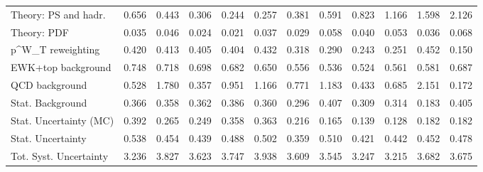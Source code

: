 \begin{tabular}{l|p{0.6cm}p{0.6cm}p{0.6cm}p{0.6cm}p{0.6cm}p{0.6cm}p{0.6cm}p{0.6cm}p{0.6cm}p{0.6cm}p{0.6cm}}
Theory: PS and hadr.                     & 0.656 & 0.443 & 0.306 & 0.244 & 0.257 & 0.381 & 0.591 & 0.823 & 1.166 & 1.598 & 2.126 \\
Theory: PDF                              & 0.035 & 0.046 & 0.024 & 0.021 & 0.037 & 0.029 & 0.058 & 0.040 & 0.053 & 0.036 & 0.068 \\
p^{W}_{T} reweighting                    & 0.420 & 0.413 & 0.405 & 0.404 & 0.432 & 0.318 & 0.290 & 0.243 & 0.251 & 0.452 & 0.150 \\
EWK+top background                       & 0.748 & 0.718 & 0.698 & 0.682 & 0.650 & 0.556 & 0.536 & 0.524 & 0.561 & 0.581 & 0.687 \\
QCD background                           & 0.528 & 1.780 & 0.357 & 0.951 & 1.166 & 0.771 & 1.183 & 0.433 & 0.685 & 2.151 & 0.172 \\
Stat. Background                         & 0.366 & 0.358 & 0.362 & 0.386 & 0.360 & 0.296 & 0.407 & 0.309 & 0.314 & 0.183 & 0.405 \\
Stat. Uncertainty (MC)                   & 0.392 & 0.265 & 0.249 & 0.358 & 0.363 & 0.216 & 0.165 & 0.139 & 0.128 & 0.182 & 0.182 \\
\hline
Stat. Uncertainty                        & 0.538 & 0.454 & 0.439 & 0.488 & 0.502 & 0.359 & 0.510 & 0.421 & 0.442 & 0.452 & 0.478 \\
\hline
Tot. Syst. Uncertainty                   & 3.236 & 3.827 & 3.623 & 3.747 & 3.938 & 3.609 & 3.545 & 3.247 & 3.215 & 3.682 & 3.675 \\
\hline
\end{tabular}
